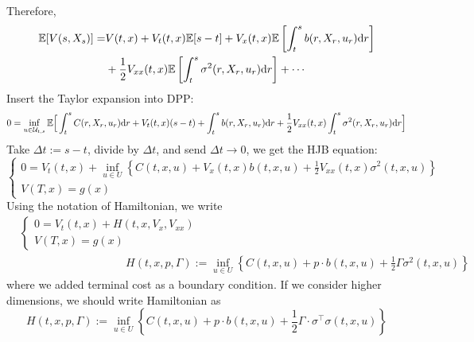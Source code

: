 \documentclass[11pt]{book}
\newcommand{\dr}{\text{\normalfont d}r}
\begin{document}
Therefore,
\[
\begin{split}
    \mathbb{E}[V(s,X_s)]  = & V(t,x) + V_t(t,x)\mathbb{E}[s-t]+V_x(t,x)\mathbb{E}\left[\int_t^s  b(r,X_r,u_r)\dr\right] \\
     &+ \frac12 V_{xx}(t,x)\mathbb{E}\left[\int_t^s  \sigma^2(r,X_r,u_r)\dr\right] + \cdots
\end{split}
\]
Insert the Taylor expansion into DPP:
\[
\begin{split}
    0= \inf_{u\in\mathcal{U}_{t,s}}\mathbb{E}\Big[\int_t^s  C(r,X_r,u_r){\dr} + V_t(t,x)(s-t) +\int_t^s  b(r,X_r,u_r)\dr+\frac12 V_{xx}(t,x)\int_t^s  \sigma^2(r,X_r,u_r)\dr\Big]
\end{split}
\]
Take $\Delta t:=s-t$, divide by $\Delta t$, and send $\Delta t\to 0$, we get the HJB equation:
\[
    \begin{cases}
    0= V_t(t,x) + \inf_{u\in U}\left\{ C(t,x,u)  + V_x(t,x) b(t,x,u)+\frac12 V_{xx}(t,x) \sigma^2(t,x,u)\right\}\\
    V(T,x)=g(x)
\end{cases}
\]
Using the notation of Hamiltonian, we write
\begin{align}
     &\begin{cases}
    0= V_t(t,x) + H(t,x,V_x,V_{xx})\\
    V(T,x)=g(x)
\end{cases}\label{eqn:HJB}\\
&\hspace{4cm}H(t,x,p,\Gamma):=\inf_{u\in U}\left\{ C(t,x,u)  + p\cdot b(t,x,u)+\frac12 \Gamma \sigma^2(t,x,u)\right\}\label{eqn:Hamilton_1d}
\end{align}
where we added terminal cost as a boundary condition.
If we consider higher dimensions, we should write Hamiltonian as  
\begin{equation}
H(t,x,p,\Gamma):=\inf_{u\in U}\left\{ C(t,x,u)  + p\cdot b(t,x,u)+\frac12 \Gamma\cdot\sigma^{\top}\sigma(t,x,u)\right\}
\end{equation}
\end{document}
